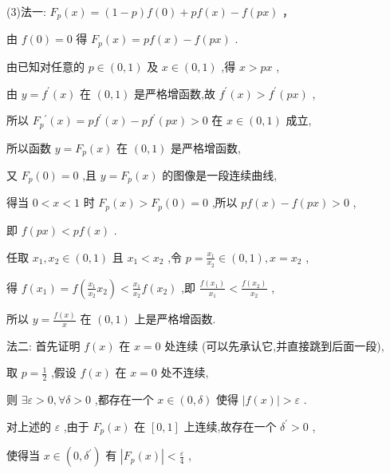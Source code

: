 \documentclass[10pt]{article}
\begin{document}
(3)法一: \({F}_{p}\left( x\right)  = \left( {1 - p}\right) f\left( 0\right)  + {pf}\left( x\right)  - f\left( {px}\right)\) ，

由 \(f\left( 0\right)  = 0\) 得 \({F}_{p}\left( x\right)  = {pf}\left( x\right)  - f\left( {px}\right)\) .

由已知对任意的 \(p \in  \left( {0,1}\right)\) 及 \(x \in  \left( {0,1}\right)\) ,得 \(x > {px}\) ,

由 \(y = {f}^{\prime }\left( x\right)\) 在 \(\left( {0,1}\right)\) 是严格增函数,故 \({f}^{\prime }\left( x\right)  > {f}^{\prime }\left( {px}\right)\) ,

所以 \({F}_{p}{}^{\prime }\left( x\right)  = p{f}^{\prime }\left( x\right)  - p{f}^{\prime }\left( {px}\right)  > 0\) 在 \(x \in  \left( {0,1}\right)\) 成立,

所以函数 \(y = {F}_{p}\left( x\right)\) 在 \(\left( {0,1}\right)\) 是严格增函数,

又 \({F}_{p}\left( 0\right)  = 0\) ,且 \(y = {F}_{p}\left( x\right)\) 的图像是一段连续曲线,

得当 \(0 < x < 1\) 时 \({F}_{p}\left( x\right)  > {F}_{p}\left( 0\right)  = 0\) ,所以 \({pf}\left( x\right)  - f\left( {px}\right)  > 0\) ,

即 \(f\left( {px}\right)  < {pf}\left( x\right)\) .

任取 \({x}_{1},{x}_{2} \in  \left( {0,1}\right)\) 且 \({x}_{1} < {x}_{2}\) ,令 \(p = \frac{{x}_{1}}{{x}_{2}} \in  \left( {0,1}\right) ,x = {x}_{2}\) ,

得 \(f\left( {x}_{1}\right)  = f\left( {\frac{{x}_{1}}{{x}_{2}}{x}_{2}}\right)  < \frac{{x}_{1}}{{x}_{2}}f\left( {x}_{2}\right)\) ,即 \(\frac{f\left( {x}_{1}\right) }{{x}_{1}} < \frac{f\left( {x}_{2}\right) }{{x}_{2}}\) ,

所以 \(y = \frac{f\left( x\right) }{x}\) 在 \(\left( {0,1}\right)\) 上是严格增函数.

法二: 首先证明 \(f\left( x\right)\) 在 \(x = 0\) 处连续 (可以先承认它,并直接跳到后面一段),

取 \(p = \frac{1}{2}\) ,假设 \(f\left( x\right)\) 在 \(x = 0\) 处不连续,

则 \(\exists \varepsilon  > 0,\forall \delta  > 0\) ,都存在一个 \(x \in  \left( {0,\delta }\right)\) 使得 \(\left| {f\left( x\right) }\right|  > \varepsilon\) .

对上述的 \(\varepsilon\) ,由于 \({F}_{p}\left( x\right)\) 在 \(\left\lbrack  {0,1}\right\rbrack\) 上连续,故存在一个 \({\delta }^{\prime } > 0\) ,

使得当 \(x \in  \left( {0,{\delta }^{\prime }}\right)\) 有 \(\left| {{F}_{p}\left( x\right) }\right|  < \frac{\varepsilon }{4}\) ,
\end{document}
